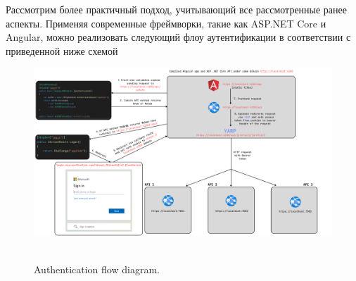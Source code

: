 Рассмотрим более практичный подход, учитывающий все рассмотренные ранее аспекты.
Применяя современные фреймворки, такие как ASP.NET Core и Angular, можно реализовать следующий флоу аутентификации
в соответствии с приведенной ниже схемой
\begin{figure}[H]
    \centering
    \includegraphics[width=1\textwidth]{img/Auth_flow_updated}
    ~\caption{Authentication flow diagram.}\label{fig:figure}
\end{figure}

